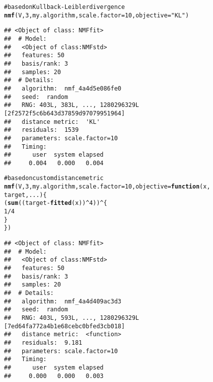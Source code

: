 \documentclass[a4paper]{article}\usepackage{graphicx, color}
\makeatletter
\newcommand{\hlfunctioncall}[1]{\textcolor[rgb]{0.501960784313725,0,0.329411764705882}{\textbf{#1}}}%
\newcommand{\hlstring}[1]{\textcolor[rgb]{0.6,0.6,1}{#1}}%
\newcommand{\hlcomment}[1]{\textcolor[rgb]{0.180392156862745,0.6,0.341176470588235}{#1}}%
\newenvironment{kframe}{%
 \def\at@end@of@kframe{}%
 \ifinner\ifhmode%
  \def\at@end@of@kframe{\end{minipage}}%
  \begin{minipage}{\columnwidth}%
 \fi\fi%
 \def\FrameCommand##1{\hskip\@totalleftmargin \hskip-\fboxsep
 \colorbox{shadecolor}{##1}\hskip-\fboxsep
     \hskip-\linewidth \hskip-\@totalleftmargin \hskip\columnwidth}%
 \MakeFramed {\advance\hsize-\width
   \@totalleftmargin\z@ \linewidth\hsize
   \@setminipage}}%
 {\par\unskip\endMakeFramed%
 \at@end@of@kframe}
\newenvironment{knitrout}{}{} %
\makeatother
\begin{document}
\begin{knitrout}
\color{fgcolor}\begin{kframe}
\begin{alltt}
\hlcomment{# based on Kullback-Leibler divergence}
\hlfunctioncall{nmf}(V, 3, my.algorithm, scale.factor = 10, objective = \hlstring{"KL"})
\end{alltt}
\begin{verbatim}
## <Object of class: NMFfit>
##  # Model:
##   <Object of class:NMFstd>
##   features: 50 
##   basis/rank: 3 
##   samples: 20 
##  # Details:
##   algorithm:  nmf_4a4d5e086fe0 
##   seed:  random 
##   RNG: 403L, 383L, ..., 1280296329L [2f2572f5c6b643d37859d97079951964]
##   distance metric:  'KL' 
##   residuals:  1539 
##   parameters: scale.factor=10 
##   Timing:
##      user  system elapsed 
##     0.004   0.000   0.004
\end{verbatim}
\begin{alltt}
\hlcomment{# based on custom distance metric}
\hlfunctioncall{nmf}(V, 3, my.algorithm, scale.factor = 10, objective = \hlfunctioncall{function}(x, 
    target, ...) \{
    (\hlfunctioncall{sum}((target - \hlfunctioncall{fitted}(x))^4))^\{
        1/4
    \}
\})
\end{alltt}
\begin{verbatim}
## <Object of class: NMFfit>
##  # Model:
##   <Object of class:NMFstd>
##   features: 50 
##   basis/rank: 3 
##   samples: 20 
##  # Details:
##   algorithm:  nmf_4a4d409ac3d3 
##   seed:  random 
##   RNG: 403L, 593L, ..., 1280296329L [7ed64fa772a4b1e68cebc0bfed3cb018]
##   distance metric:  <function> 
##   residuals:  9.181 
##   parameters: scale.factor=10 
##   Timing:
##      user  system elapsed 
##     0.000   0.000   0.003
\end{verbatim}
\end{kframe}
\end{knitrout}


%
%
\end{document}
